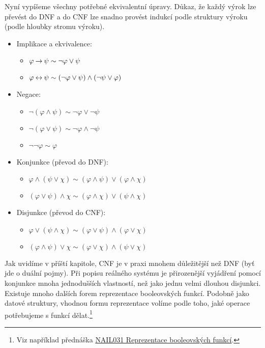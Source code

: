 Nyní vypíšeme všechny potřebné ekvivalentní úpravy. Důkaz, že každý výrok lze převést do DNF a do CNF lze snadno provést indukcí podle struktury výroku (podle hloubky stromu výroku).

\begin{tcolorbox}
\begin{multicols}{2}
\begin{itemize}
    \item Implikace a ekvivalence:
    \begin{itemize}
        \item[] $\varphi\mathbin{\rightarrow}\psi\sim\neg\varphi\lor\psi$
        \item[] $\varphi\mathbin{\leftrightarrow}\psi\sim(\neg\varphi\lor\psi)\land(\neg\psi\lor\varphi)$
    \end{itemize}
    \item Negace:
    \begin{itemize}
        \item[] $\neg(\varphi\land\psi)\sim\neg\varphi\lor\neg\psi$
        \item[] $\neg(\varphi\lor\psi)\sim\neg\varphi\land\neg\psi$
        \item[] $\neg\neg\varphi\sim\varphi$
    \end{itemize}
    \item Konjunkce (převod do DNF):
    \begin{itemize}
        \item[] $\varphi \land (\psi\lor\chi) \sim (\varphi\land\psi)\lor (\varphi\land\chi)$
        \item[] $(\varphi \lor \psi)\land\chi \sim (\varphi\land\chi)\lor (\psi\land\chi)$
    \end{itemize}
    \item Disjunkce (převod do CNF):
    \begin{itemize}
        \item[] $\varphi \lor (\psi\land\chi) \sim (\varphi\lor\psi)\land (\varphi\lor\chi)$
        \item[] $(\varphi \land \psi)\lor\chi \sim (\varphi\lor\chi)\land (\psi\lor\chi)$
    \end{itemize}
\end{itemize}
\end{multicols}
\end{tcolorbox}


Jak uvidíme v příští kapitole, CNF je v praxi mnohem důležitější než DNF (byť jde o duální pojmy). Při popisu reálného systému je přirozenější vyjádření pomocí konjunkce mnoha jednodušších vlastností, než jako jednu velmi dlouhou disjunkci. Existuje mnoho dalších forem reprezentace booleovských funkcí. Podobně jako datové struktury, vhodnou formu reprezentace volíme podle toho, jaké operace potřebujeme s funkcí dělat.\footnote{Viz například přednáška \href{https://is.cuni.cz/studium/predmety/index.php?do=predmet&kod=NAIL031}{NAIL031 Reprezentace booleovských funkcí}.}


